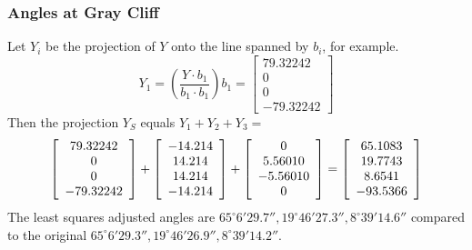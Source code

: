 \documentclass[xcolor=dvipsnames]{beamer}
\begin{document}
\begin{frame}
  \frametitle{Angles at Gray Cliff}
  Let $Y_{i}$ be the projection of $Y$ onto the line spanned by
  $b_{i}$, for example. 
  \begin{equation}
    \label{eq:zeoyeobe}
    Y_{1}=\left(\frac{Y\cdot{}b_{1}}{b_{1}\cdot{}b_{1}}\right)b_{1}=\left[
      \begin{array}{c}
        79.32242 \\
        0 \\
        0 \\
        -79.32242
      \end{array}\right]
  \end{equation}
  Then the projection $Y_{S}$ equals $Y_{1}+Y_{2}+Y_{3}=$
  \begin{equation}
    \label{eq:yeeyaesh}
    \left[
      \begin{array}{c}
        79.32242 \\
        0 \\
        0 \\
        -79.32242
      \end{array}\right]+\left[
      \begin{array}{c}
        -14.214 \\
        14.214 \\
        14.214 \\
        -14.214
      \end{array}\right]+\left[
      \begin{array}{c}
        0 \\
        5.56010 \\
        -5.56010 \\
        0
      \end{array}\right]=\left[
      \begin{array}{c}
        65.1083 \\
        19.7743 \\
        8.6541 \\
        -93.5366
      \end{array}\right]\notag
  \end{equation}
  The least squares adjusted angles are
  $65^{\circ}6'29.7'',19^{\circ}46'27.3'',8^{\circ}39'14.6''$ compared
  to the original
  $65^{\circ}6'29.3'',19^{\circ}46'26.9'',8^{\circ}39'14.2''$.
\end{frame}
\end{document}

